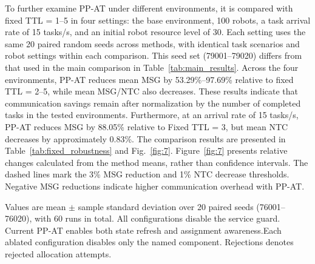 \documentclass[type=submission,name=IR]{oae}
\begin{document}
To further examine PP-AT under different environments, it is compared with fixed TTL = 1--5 in four settings: the base environment, 100 robots, a task arrival rate of 15 tasks/s, and an initial robot resource level of 30. Each setting uses the same 20 paired random seeds across methods, with identical task scenarios and robot settings within each comparison. This seed set (79001--79020) differs from that used in the main comparison in Table~\ref{tab:main_results}. Across the four environments, PP-AT reduces mean MSG by 53.29\%--97.69\% relative to fixed TTL = 2--5, while mean MSG/NTC also decreases. These results indicate that communication savings remain after normalization by the number of completed tasks in the tested environments. Furthermore, at an arrival rate of 15 tasks/s, PP-AT reduces MSG by 88.05\% relative to Fixed TTL = 3, but mean NTC decreases by approximately 0.83\%.  The comparison results are presented in Table~\ref{tab:fixed_robustness} and Fig.~\ref{fig:7}. Figure~\ref{fig:7} presents relative changes calculated from the method means, rather than confidence intervals. The dashed lines mark the 3\% MSG reduction and 1\% NTC decrease thresholds. Negative MSG reductions indicate higher communication overhead with PP-AT.
\begin{table}[htb]
\centering
\caption{Direct Component Ablation Results Under MPDM}
\label{tab:6}
\begingroup
\small
\setlength{\tabcolsep}{4pt}
\par\smallskip
\begin{minipage}{\linewidth}
\footnotesize
Values are mean $\pm$ sample standard deviation over 20 paired seeds (76001--76020), with 60 runs in total. All configurations disable the service guard. Current PP-AT enables both state refresh and assignment awareness.Each ablated configuration disables only the named component. Rejections denotes rejected allocation attempts.
\end{minipage}
\endgroup
\end{table}
\end{document}

